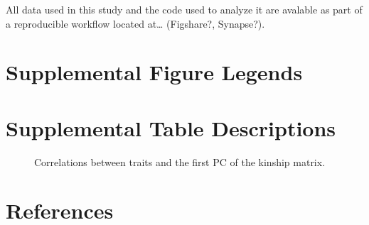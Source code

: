 \documentclass[10pt,letterpaper]{article}
\begin{document}
All data used in this study and the code used to analyze it are avalable
as part of a reproducible workflow located at\ldots{} (Figshare?,
Synapse?).

\hypertarget{supplemental-figure-legends}{%
\section{Supplemental Figure
Legends}\label{supplemental-figure-legends}}

\begin{figure}[ht]
\centering
\caption{
}
\label{fig:trait_cor}
\end{figure}

\hypertarget{supplemental-table-descriptions}{%
\section{Supplemental Table
Descriptions}\label{supplemental-table-descriptions}}

\begin{figure}[ht]
\centering
\caption{Correlations between traits and the first PC of the kinship matrix.
}
\label{table:trait_cor}
\end{figure}

\hypertarget{references}{%
\section*{References}\label{references}}

\nolinenumbers
\end{document}
